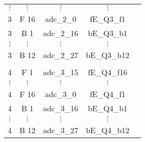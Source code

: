 \begin{tabular}{ccccc}
$\vdots$  & $\vdots$           & $\vdots$    & $\vdots$         \\
3         & F 16               & adc\_2\_0   & fE\_Q3\_f1       \\
3         & B 1                & adc\_2\_16  & bE\_Q3\_b1       \\
$\vdots$  & $\vdots$           & $\vdots$    & $\vdots$         \\
3         & B 12               & adc\_2\_27  & bE\_Q3\_b12      \\
          &                    &             &                  \\
4         & F 1                & adc\_3\_15  & fE\_Q4\_f16      \\
$\vdots$  & $\vdots$           & $\vdots$    & $\vdots$         \\
4         & F 16               & adc\_3\_0   & fE\_Q4\_f1       \\
4         & B 1                & adc\_3\_16  & bE\_Q4\_b1       \\
$\vdots$  & $\vdots$           & $\vdots$    & $\vdots$         \\
4         & B 12               & adc\_3\_27  & bE\_Q4\_b12      \\
\hline
\end{tabular}